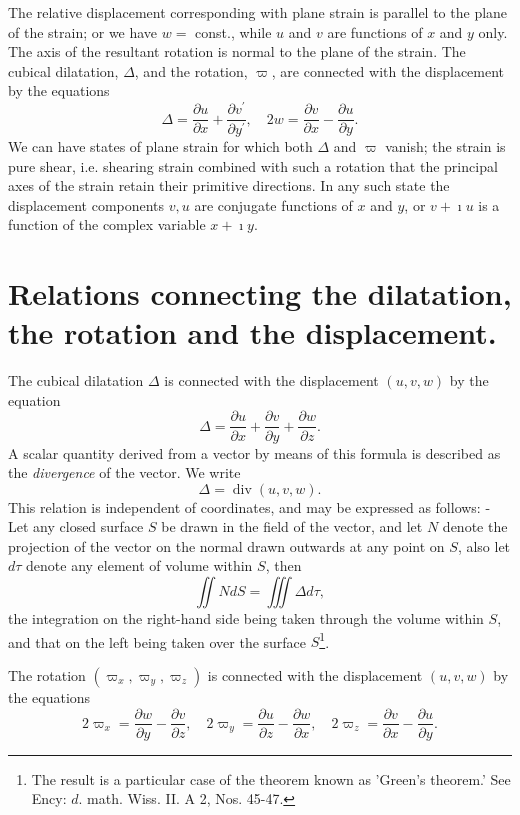 The relative displacement corresponding with plane strain is parallel to the
plane of the strain; or we have \(w=\) const., while \(u\) and \(v\) are
functions of \(x\) and \(y\) only. The axis of the resultant rotation is normal
to the plane of the strain. The cubical dilatation, \(\Delta\), and the
rotation, \(\varpi\), are connected with the displacement by the equations
\[
\Delta=\frac{\partial u}{\partial x}+\frac{\partial v^{\prime}}{\partial
y^{\prime}}, \quad 2 w=\frac{\partial v}{\partial x}-\frac{\partial u}{\partial
y}.
\]
We can have states of plane strain for which both \(\Delta\) and \(\varpi\)
vanish; the strain is pure shear, i.e. shearing strain combined with such a
rotation that the principal axes of the strain retain their primitive
directions. In any such state the displacement components \(v, u\) are
conjugate functions of \(x\) and \(y\), or \(v+\imath u\) is a function of the
complex variable \(x+\imath y\).

\section{Relations connecting the dilatation, the rotation and the displacement.} %
The cubical dilatation \(\Delta\) is connected with the displacement
\((u, v, w)\) by the equation
\[
\Delta=\frac{\partial u}{\partial x}+\frac{\partial v}{\partial y}+
\frac{\partial w}{\partial z}.
\]
A scalar quantity derived from a vector by means of this formula is described
as the \textit{divergence} of the vector. We write
\begin{equation}\label{eq:14}
\Delta=\operatorname{div}(u, v, w).
\end{equation}
This relation is independent of coordinates, and may be expressed as
follows: - Let any closed surface \(S\) be drawn in the field of the vector, and
let \(N\) denote the projection of the vector on the normal drawn outwards at
any point on \(S\), also let \(d \tau\) denote any element of volume within
\(S\), then
\begin{equation}\label{eq:15}
\iint N d S=\iiint \Delta d \tau,
\end{equation}
the integration on the right-hand side being taken through the volume within
\(S\), and that on the left being taken over the
surface \(S\)\footnote{The result is a particular case of the theorem known as
'Green's theorem.' See Ency: \(d\). math. Wiss. II. A 2, Nos. 45-47.}.

The rotation \(\left(\varpi_x, \varpi_y, \varpi_z\right)\) is connected with
the displacement \((u, v, w)\) by the equations
\[
2 \varpi_x=\frac{\partial w}{\partial y}-\frac{\partial v}{\partial z}, \quad
2 \varpi_y=\frac{\partial u}{\partial z}-\frac{\partial w}{\partial x}, \quad
2 \varpi_z=\frac{\partial v}{\partial x}-\frac{\partial u}{\partial y} .
\]

